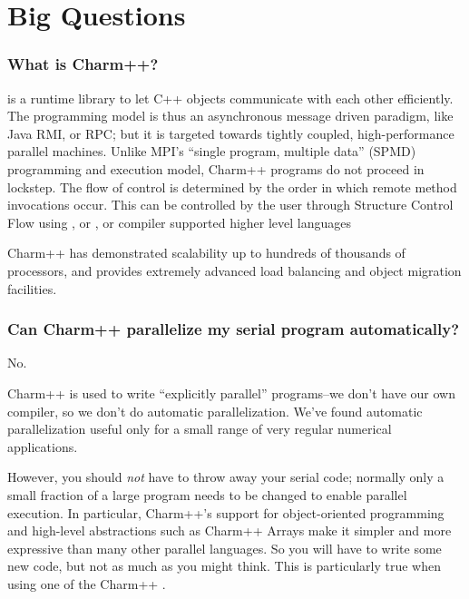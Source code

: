 \section{Big Questions}

\subsubsection{What is Charm++?}

is a runtime library to let C++ objects communicate with each other
efficiently.  The programming model is thus an asynchronous message
driven paradigm, like Java RMI, or RPC; but it is targeted towards
tightly coupled, high-performance parallel machines.  Unlike MPI's
``single program, multiple data'' (SPMD) programming and execution model, Charm++ programs do not proceed in lockstep.  The flow of control is determined by the order in which remote method invocations occur.  This can be controlled by the user through Structure Control Flow using  , or , or compiler supported higher level languages 

Charm++ has demonstrated scalability up to hundreds of thousands of processors,
and provides extremely advanced load balancing and object migration facilities.

\subsubsection{Can Charm++ parallelize my serial program automatically?}

No.

Charm++ is used to write ``explicitly parallel'' programs--we don't have
our own compiler, so we don't do automatic parallelization. We've found
automatic parallelization useful only for a small range of very regular
numerical applications.

However, you should { \em not} have to throw away your serial code;
normally only a small fraction of a large program needs to be changed to
enable parallel execution. In particular, Charm++'s support for object-oriented
programming and high-level abstractions such as Charm++ Arrays make it
simpler and more expressive than many other parallel languages. So you
will have to write some new code, but not as much as you might think. This
is particularly true when using one of the Charm++ .

